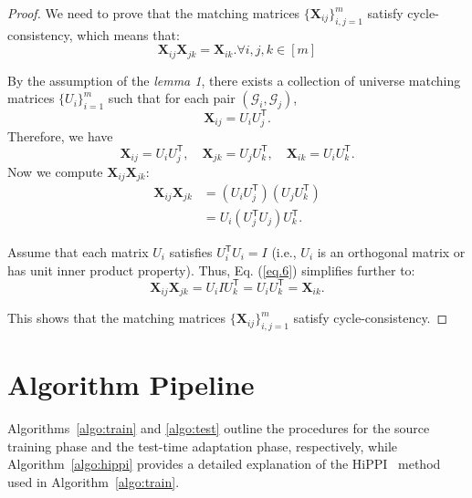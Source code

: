 \begin{proof}
We need to prove that the matching matrices $\{\mathbf{X}_{ij}\}_{i,j=1}^m$ satisfy cycle-consistency, which means that:
\begin{equation}
    \mathbf{X}_{ij} \mathbf{X}_{jk} = \mathbf{X}_{ik}. \forall i, j, k\in [m]
\end{equation}
 
By the assumption of the \textit{lemma 1}, there exists a collection of universe matching matrices $\{ U_i \}_{i=1}^m$ such that for each pair $(\mathcal{G}_i, \mathcal{G}_j)$,
\begin{equation}
    \mathbf{X}_{ij} = U_i U_j^{\mathsf{T}}.
\end{equation}
Therefore, we have
\begin{equation}
    \mathbf{X}_{ij} = U_i U_j^{\mathsf{T}}, \quad \mathbf{X}_{jk} = U_j U_k^{\mathsf{T}}, \quad \mathbf{X}_{ik} = U_i U_k^{\mathsf{T}}.
\end{equation}
Now we compute $\mathbf{X}_{ij} \mathbf{X}_{jk}$:
\begin{align}
    \mathbf{X}_{ij} \mathbf{X}_{jk} &= (U_i U_j^{\mathsf{T}})(U_j U_k^{\mathsf{T}}) \nonumber \\ 
    &= U_i (U_j^{\mathsf{T}} U_j) U_k^{\mathsf{T}}. 
    \label{eq.6}
\end{align}

Assume that each matrix $U_i$ satisfies $U_i^{\mathsf{T}} U_i = I$ (i.e., $U_i$ is an orthogonal matrix or has unit inner product property). 
Thus, Eq. (\ref{eq.6}) simplifies further to:
\begin{equation}
    \mathbf{X}_{ij} \mathbf{X}_{jk} = U_i I U_k^{\mathsf{T}} = U_i U_k^{\mathsf{T}} = \mathbf{X}_{ik}.
\end{equation}

This shows that the matching matrices $\{\mathbf{X}_{ij}\}_{i,j=1}^m$ satisfy cycle-consistency. 
\end{proof}


\section{Algorithm Pipeline}
\label{sec:algo}
Algorithms~\ref{algo:train} and \ref{algo:test} outline the procedures for the source training phase and the test-time adaptation phase, respectively, while Algorithm~\ref{algo:hippi} provides a detailed explanation of the HiPPI~\cite{bernard2019hippi} method used in Algorithm~\ref{algo:train}.

